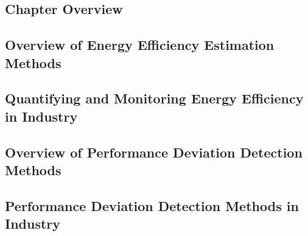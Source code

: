 \subsection{Chapter Overview}

\subsection{Overview of Energy Efficiency Estimation Methods}

\subsection{Quantifying and Monitoring Energy Efficiency in Industry}

\subsection{Overview of Performance Deviation Detection Methods}

\subsection{Performance Deviation Detection Methods in Industry}